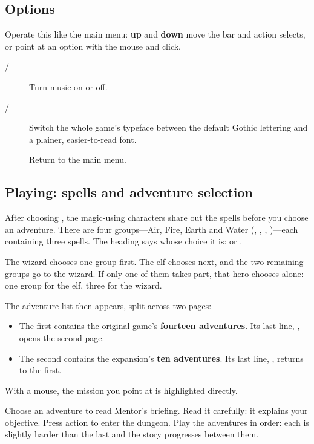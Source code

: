 \subsection{Options}
Operate this like the main menu: \textbf{up} and \textbf{down} move the bar and action selects, or point at an option with the mouse and click.
\begin{description}
\item[/] Turn music on or off.
\item[/] Switch the whole game's typeface between the default Gothic lettering and a plainer, easier-to-read font.
\item[] Return to the main menu.
\end{description}
\subsection{Playing: spells and adventure selection}
After choosing , the magic-using characters share out the spells before you choose an adventure. There are four groups---Air, Fire, Earth and Water (, , , )---each containing three spells.
The heading says whose choice it is:  or .

The wizard chooses one group first. The elf chooses next, and the two remaining groups go to the wizard. If only one of them takes part, that hero chooses alone: one group for the elf, three for the wizard.

The adventure list then appears, split across two pages:
\begin{itemize}
\item The first contains the original game's \textbf{fourteen adventures}. Its last line, , opens the second page.
\item The second contains the expansion's \textbf{ten adventures}. Its last line, , returns to the first.
\end{itemize}
With a mouse, the mission you point at is highlighted directly.

Choose an adventure to read Mentor's briefing. Read it carefully: it explains your objective. Press action to enter the dungeon. Play the adventures in order: each is slightly harder than the last and the story progresses between them.
